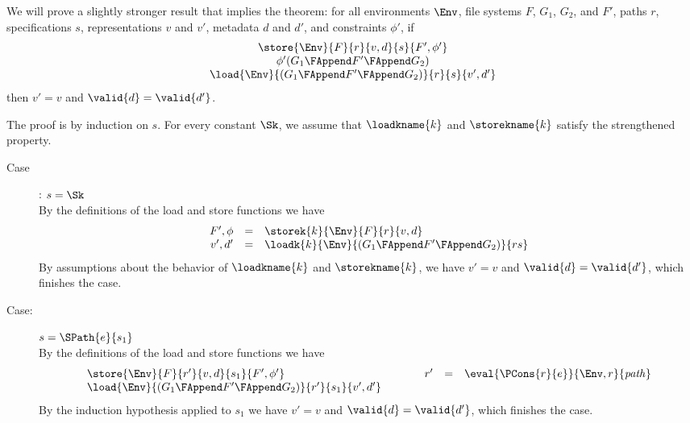 %
{ We will prove a slightly stronger result that implies the theorem:
  for all environments $\Env$, file systems $F$, $G_1$, $G_2$, and
  $F'$, paths $r$, specifications $s$, representations $v$ and $v'$,
  metadata $d$ and $d'$, and constraints $\phi'$, if 
%
\[
\begin{array}{c}
  \store{\Env}{F}{r}{v,d}{s}{F',\phi'}\\
  \phi'(G_1 \FAppend F' \FAppend G_2)\\
  \load{\Env}{(G_1 \FAppend F' \FAppend G_2)}{r}{s}{v',d'}
\end{array}
\]
%
then $v' = v$ and $\valid{d} = \valid{d'}$. 

The proof is by induction on $s$. For every constant $\Sk$, we assume
that $\loadkname{k}$ and $\storekname{k}$ satisfy the strengthened
property.
\begin{description}
\item[Case]: $s = \Sk$\\[1ex]
%
By the definitions of the load and store functions we have 
\[ 
\begin{array}{rcll}
F',\phi &=& \storek{k}{\Env}{F}{r}{v,d}\\
v',d'  &=& \loadk{k}{\Env}{(G_1 \FAppend F' \FAppend G_2)}{rs}\\
\end{array}
\]
By assumptions about the behavior of $\loadkname{k}$ and
$\storekname{k}$, we have $v' = v$ and $\valid{d} = \valid{d'}$,
which finishes the case. 

\item[Case:] $s=\SPath{e}{s_1}$\\[1ex]
%
By the definitions of the load and store functions we have
\[
\begin{array}{l}
\store{\Env}{F}{r'}{v,d}{s_1}{F',\phi'}\\
\load{\Env}{(G_1 \FAppend F' \FAppend G_2)}{r'}{s_1}{v',d'}
\end{array}\hspace*{1cm}\begin{array}{rcl}
r' &=& \eval{\PCons{r}{e}}{\Env,r}{\mathit{path}}\\
\\
\end{array}
\]
%
By the induction hypothesis applied to $s_1$ we have $v' = v$ and
$\valid{d} = \valid{d'}$, which finishes the case.


\end{description}}
